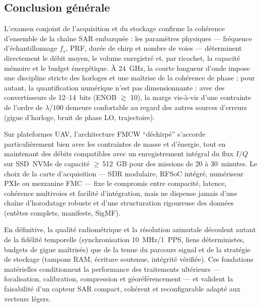 \subsection*{Conclusion générale}

L’examen conjoint de l’acquisition et du stockage confirme la cohérence d’ensemble de la chaîne SAR embarquée : les paramètres physiques — fréquence d’échantillonnage $f_s$, PRF, durée de chirp et nombre de voies — déterminent directement le débit moyen, le volume enregistré et, par ricochet, la capacité mémoire et le budget énergétique. À 24~GHz, la courte longueur d’onde impose une discipline stricte des horloges et une maîtrise de la cohérence de phase ; pour autant, la quantification numérique n’est pas dimensionnante : avec des convertisseurs de 12–14~bits (ENOB $\gtrsim$ 10), la marge vis-à-vis d’une contrainte de l’ordre de $\lambda/100$ demeure confortable au regard des autres sources d’erreurs (gigue d’horloge, bruit de phase LO, trajectoire).

Sur plateformes UAV, l’architecture FMCW “déchirpé” s’accorde particulièrement bien avec les contraintes de masse et d’énergie, tout en maintenant des débits compatibles avec un enregistrement intégral du flux $I/Q$ sur SSD~NVMe de capacité $\geq$\,512~GB pour des missions de 20 à 30~minutes. Le choix de la carte d’acquisition — SDR modulaire, RFSoC intégré, numériseur PXIe ou mezzanine FMC — fixe le compromis entre compacité, latence, cohérence multivoies et facilité d’intégration, mais ne dispense jamais d’une chaîne d’horodatage robuste et d’une structuration rigoureuse des données (entêtes complets, manifeste, SigMF).

En définitive, la qualité radiométrique et la résolution azimutale découlent autant de la fidélité temporelle (synchronisation 10~MHz/1~PPS, liens déterministes, budgets de gigue maîtrisés) que de la tenue du parcours signal et de la stratégie de stockage (tampons RAM, écriture soutenue, intégrité vérifiée). Ces fondations matérielles conditionnent la performance des traitements ultérieurs — focalisation, calibration, compression et géoréférencement — et valident la faisabilité d’un capteur SAR compact, cohérent et reconfigurable adapté aux vecteurs légers.
